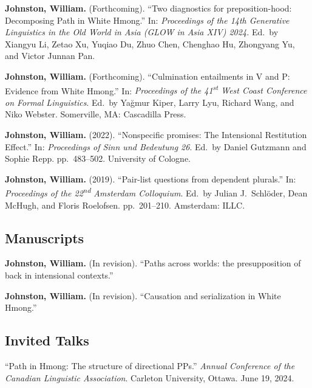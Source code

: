 \documentclass[11pt,oneside,DIV=calc,parskip=off]{scrarticle} %
\newlength{\spacingbefore}
\newlength{\spacingafter}
\newcommand{\myonecol}[1]{%
	\vspace{\spacingbefore}%
	\begin{minipage}[t]{\linewidth}%
		\strut#1%
	\end{minipage}%
	\vspace{\spacingafter}\par%
	}
\newcommand{\pub}[1]{%
	\myonecol{#1}%
	}
\newcommand{\talk}[1]{%
	\myonecol{#1}%
	}
\begin{document}
\pub{\textbf{Johnston, William.} (Forthcoming). ``Two diagnostics for preposition-hood: Decomposing Path in White Hmong.'' In: \emph{Proceedings of the 14th Generative Linguistics in the Old World in Asia (GLOW in Asia XIV) 2024.} Ed.\ by Xiangyu Li, Zetao Xu, Yuqiao Du, Zhuo Chen, Chenghao Hu, Zhongyang Yu, and Victor Junnan Pan.}
\pub{\textbf{Johnston, William.} (Forthcoming). ``Culmination entailments in V and P: Evidence from White Hmong.'' In: \textit{Proceedings of the 41\textsuperscript{st} West Coast Conference on Formal Linguistics}. Ed.\ by Yağmur Kiper, Larry Lyu, Richard Wang, and Niko Webster. Somerville, MA: Cascadilla Press.}
\pub{\textbf{Johnston, William.} (2022). ``Nonspecific promises: The Intensional Restitution Effect.'' In: \textit{Proceedings of Sinn und Bedeutung 26}. Ed.\ by Daniel Gutzmann and Sophie Repp. pp.\ 483--502. University of Cologne.}
\pub{\textbf{Johnston, William.} (2019). ``Pair-list questions from dependent plurals.'' In: \textit{Proceedings of the 22\textsuperscript{nd} Amsterdam Colloquium}. Ed.\ by Julian J.\ Schl\"oder, Dean McHugh, and Floris Roelofsen. pp.\ 201--210. Amsterdam: ILLC.}



\subsection{Manuscripts}
\pub{\textbf{Johnston, William.} (In revision). ``Paths across worlds: the presupposition of back in intensional contexts.'' %
} 

\pub{\textbf{Johnston, William.} (In revision). ``Causation and serialization in White Hmong.''} %

\subsection{Invited Talks}
\talk{``Path in Hmong: The structure of directional PPs.'' \textit{Annual Conference of the Canadian Linguistic Association}. Carleton University, Ottawa. June 19, 2024.}
\end{document}
